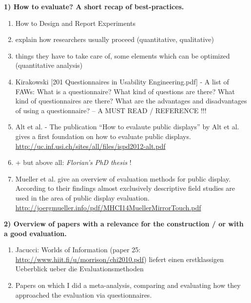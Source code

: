 

	\textbf{1) How to evaluate? A short recap of best-practices.}

		\begin{enumerate}
		\item How to Design and Report Experiments \cite{field2003design}
		\item explain how researchers usually proceed (quantitative, qualitative)
		\item things they have to take care of, some elements which can be optimized (quantitative analysis)


		\item Kirakowski [201 Questionnaires in Usability Engineering.pdf] - A list of FAWs: What is a questionnaire? What kind of questions are there? What kind of questionnaires are there? What are the advantages and disadvantages of using a questionnaire? 		--   A MUST READ / REFERENCE !!!



		\item Alt et al. \cite{Alt2012HowToEvaluate}  -  The publication ``How to evalaute public displays'' by Alt et al. gives a first foundation on how to evaluate public displays. \url{http://uc.inf.usi.ch/sites/all/files/ispd2012-alt.pdf} %
		\item + but above all: \textit{Florian's PhD thesis} \cite{alt2013thesis}!

		\item Mueller et al. \cite{muller2014mirrortouch} give an overview of evaluation methods for public display. According to their findings almost exclusively descriptive field studies are used in the area of public display evaluation. \url{http://joergmueller.info/pdf/MHCI14MuellerMirrorTouch.pdf}

		\end{enumerate}




	\textbf{2) Overview of papers with a relevance for the construction / or with a good evaluation.}

		\begin{enumerate}
		\item Jacucci: Worlds of Information (paper 25: \url{http://www.hiit.fi/u/morrison/chi2010.pdf}) liefert einen erstklassigen Ueberblick ueber die Evaluationsmethoden
		\item Papers on which I did a meta-analysis, comparing and evaluating how they approached the evaluation via questionnaires.
	\end{enumerate}






